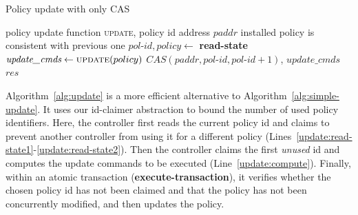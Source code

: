 \documentclass[conference]{sigcomm-alternate}
\newcommand{\paddr}{\textit{paddr}\xspace}
\newcommand{\pid}{\textit{pol-id}\xspace}
\newcommand{\ufunc}{update} %
\newcommand{\execatomic}{\textbf{execute-transaction}}
\newcommand{\ack}{\textit{ack}}
\begin{document}
{\small
\begin{algorithm}[t]
    \caption{Policy update with only CAS}
    \label{alg:simple-update}
    \begin{algorithmic}[1]
    \Require policy update function \textsc{\ufunc}, policy id address $\paddr$
    \Ensure installed policy is consistent with previous one
 		\Repeat
 			\State $\pid,\textit{policy}\gets$ \textbf{read-state} %
 			\State $\textit{update\_cmds}\gets \textsc{\ufunc}(policy)$
 			\startTxn
	 			\State $CAS(\paddr,\pid,\pid+1)$,
	 			\State $\textit{update\_cmds}$ %
 			\endTxn
     	\Until{$\textit{res}=\ack$}
			\Return $\textit{res}$

    \end{algorithmic}
\end{algorithm}
}



Algorithm~\ref{alg:update} is a more efficient alternative 
to Algorithm~\ref{alg:simple-update}. It uses our id-claimer abstraction
to bound the number of used policy identifiers.
Here, the controller first reads the current policy id and claims to prevent another controller from using it 
for a
different policy (Lines~\ref{update:read-state1}-\ref{update:read-state2}).
Then the controller claims the first \emph{unused} id and computes the update commands to be executed (Line~\ref{update:compute}).
Finally, within an atomic transaction (\textbf{\execatomic}), it verifies whether the chosen policy id has not
been claimed and that
the policy has not been concurrently modified, and then updates the policy.
\end{document}
